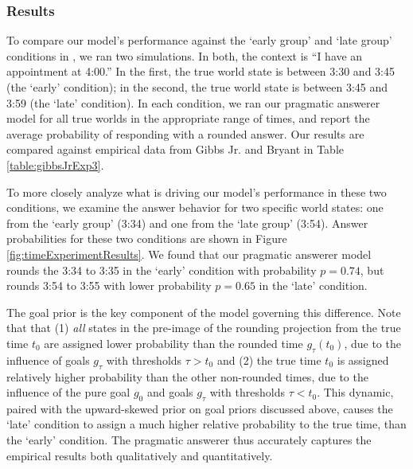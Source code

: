 \documentclass[12pt, floatsintext, jou]{apa6}
\begin{document}

 \subsubsection{Results}
 
To compare our model's performance against the `early group' and `late group' conditions in , we ran two simulations. In both, the context is ``I have an appointment at 4:00.'' In the first, the true world state is between 3:30 and 3:45 (the `early' condition); in the second, the true world state is between 3:45 and 3:59 (the `late' condition). In each condition, we ran our pragmatic answerer model for all true worlds in the appropriate range of times, and report the average probability of responding with a rounded answer. Our results are compared against empirical data from Gibbs Jr. and Bryant \citeyear{GibbsBryant08_OptimalRelevance} in Table \ref{table:gibbsJrExp3}. 

To more closely analyze what is driving our model's performance in these two conditions, we examine the answer behavior for two specific world states: one from the `early group' (3:34) and one from the `late group' (3:54). Answer probabilities for these two conditions are shown in Figure \ref{fig:timeExperimentResults}. We found that our pragmatic answerer model rounds the 3:34 to 3:35 in the `early' condition with probability $p = 0.74$, but rounds 3:54 to 3:55 with lower probability $p = 0.65$ in the `late' condition. 

The goal prior is the key component of the model governing this difference. Note that that (1) \emph{all} states in the pre-image of the rounding projection from the true time $t_0$ are assigned lower probability than the rounded time $g_\tau(t_0)$, due to the influence of goals $g_\tau$ with thresholds $\tau > t_0$ and (2) the true time $t_0$ is assigned relatively higher probability than the other non-rounded times, due to the influence of the pure goal $g_0$ and goals $g_\tau$ with thresholds $\tau < t_0$. This dynamic, paired with the upward-skewed prior on goal priors discussed above, causes the `late' condition to assign a much higher relative probability to the true time, than the `early' condition. The pragmatic answerer thus accurately captures the empirical results both qualitatively and quantitatively. 

\end{document}
